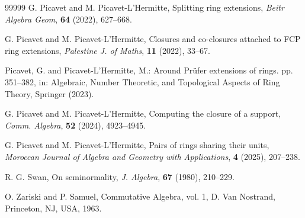 \documentclass[12pt,leqno]{amsart}
\theoremstyle{definition}
\begin{document}
\begin{thebibliography}{99999}
 G. Picavet and M. Picavet-L'Hermitte, Splitting ring extensions, {\it Beitr Algebra Geom}, {\bf 64} (2022), 627--668.

 G. Picavet and M. Picavet-L'Hermitte, Closures and co-closures attached to FCP ring extensions,     {\it Palestine J. of Maths}, {\bf 11} (2022), 33--67.

 Picavet, G. and Picavet-L'Hermitte, M.: Around Pr\"ufer extensions of rings. pp. 351--382, in: Algebraic, Number Theoretic, and Topological Aspects of Ring Theory, Springer (2023).

   G. Picavet and M. Picavet-L'Hermitte,   Computing the closure of a support, {\it Comm. Algebra}, {\bf 52} (2024), 4923--4945. 

 G. Picavet and M. Picavet-L'Hermitte, Pairs of rings sharing their units,  {\it Moroccan Journal of Algebra and Geometry with Applications}, {\bf 4} (2025), 207--238.

 R. G. Swan, On seminormality, {\it J.  Algebra}, {\bf 67} (1980), 210--229.

 O. Zariski and P. Samuel, Commutative Algebra, vol. 1, D. Van Nostrand, Princeton, NJ, USA,  1963.

\end{thebibliography}
\end{document}
